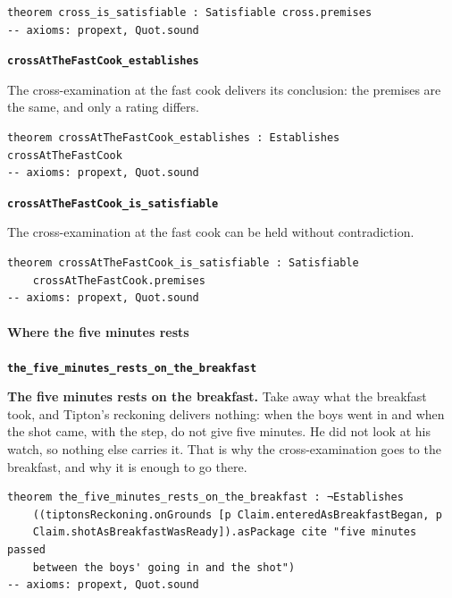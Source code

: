\documentclass[11pt]{article}
\begin{document}
{\small\begin{verbatim}
theorem cross_is_satisfiable : Satisfiable cross.premises
-- axioms: propext, Quot.sound
\end{verbatim}}
\par\medskip\noindent\textbf{\texttt{cross\allowbreak{}At\allowbreak{}The\allowbreak{}Fast\allowbreak{}Cook\_\allowbreak{}establishes}}\par\nobreak\noindent
The cross-examination at the fast cook delivers its conclusion: the premises are the same, and only a rating differs.

{\small\begin{verbatim}
theorem crossAtTheFastCook_establishes : Establishes crossAtTheFastCook
-- axioms: propext, Quot.sound
\end{verbatim}}
\par\medskip\noindent\textbf{\texttt{cross\allowbreak{}At\allowbreak{}The\allowbreak{}Fast\allowbreak{}Cook\_\allowbreak{}is\_\allowbreak{}satisfiable}}\par\nobreak\noindent
The cross-examination at the fast cook can be held without contradiction.

{\small\begin{verbatim}
theorem crossAtTheFastCook_is_satisfiable : Satisfiable
    crossAtTheFastCook.premises
-- axioms: propext, Quot.sound
\end{verbatim}}
\paragraph*{Where the five minutes rests}
\leavevmode\par\nobreak
\par\medskip\noindent\textbf{\texttt{the\_\allowbreak{}five\_\allowbreak{}minutes\_\allowbreak{}rests\_\allowbreak{}on\_\allowbreak{}the\_\allowbreak{}breakfast}}\par\nobreak\noindent
\textbf{The five minutes rests on the breakfast.} Take away what the breakfast took, and Tipton’s reckoning delivers nothing: when the boys went in and when the shot came, with the step, do not give five minutes. He did not look at his watch, so nothing else carries it. That is why the cross-examination goes to the breakfast, and why it is enough to go there.

{\small\begin{verbatim}
theorem the_five_minutes_rests_on_the_breakfast : ¬Establishes
    ((tiptonsReckoning.onGrounds [p Claim.enteredAsBreakfastBegan, p
    Claim.shotAsBreakfastWasReady]).asPackage cite "five minutes passed
    between the boys' going in and the shot")
-- axioms: propext, Quot.sound
\end{verbatim}}
\end{document}

